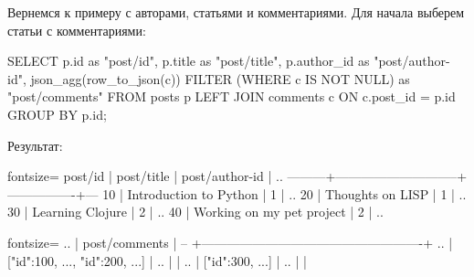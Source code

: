 Вернемся к примеру с авторами, статьями и комментариями. Для начала выберем статьи с комментариями:


\begin{english}
  \begin{sql}
SELECT
  p.id        as "post/id",
  p.title     as "post/title",
  p.author_id as "post/author-id",
  json_agg(row_to_json(c)) FILTER
          (WHERE c IS NOT NULL) as "post/comments"
FROM posts p
LEFT JOIN comments c ON c.post_id = p.id
GROUP BY p.id;
  \end{sql}
\end{english}

Результат:



\begin{english}
  \begin{text*}{fontsize=\small}
 post/id |         post/title          | post/author-id | ..
---------+-----------------------------+----------------+---
      10 | Introduction to Python      |              1 | ..
      20 | Thoughts on LISP            |              1 | ..
      30 | Learning Clojure            |              2 | ..
      40 | Working on my pet project   |              2 | ..
  \end{text*}
\end{english}

\begin{english}
  \begin{text*}{fontsize=\small}
.. |                    post/comments                   |
-- +----------------------------------------------------+
.. | [{"id":100, ...}, {"id":200, ...}]                 |
.. |                                                    |
.. | [{"id":300, ...}]                                  |
.. |                                                    |
  \end{text*}
\end{english}



